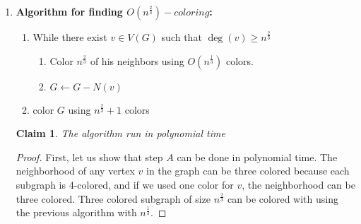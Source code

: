 \documentclass{article}
\newtheorem{claim}[section]{Claim}
\begin{document}
\begin{enumerate}
\begin{enumerate}
	\begin{claim}
		The algorithm run in polynomial time
\end{claim}
\begin{proof}
	First, let us show that step $A$ can be done in polynomial time. The neighborhood of any vertex $v$ in the graph can be two colored because each subgraph is three colored, and if we used one color for $v$, the neighborhood can be two colored. Two colored subgraph is also a two bipartite graph, hence we can use the previous question to color it using 2 colors.
	
	The loop in step $i$ runs at most $\sqrt{n}$ times because each iteration, we remove at least $\sqrt{n}$ vertices from $G$. Additionally, each iteration run polynomial time. Hence, the total run time of step $i$ is polynomial.
	
	Step $ii$ runs in polynomial time using the algorithm from the previous section.
\end{proof}

\begin{claim}
	The algorithm is using $O(\sqrt n)$ colors
\end{claim}
\begin{proof}
	In each iteration of loop $i$, we use two colors. There are at most $\sqrt{n}$ iteration, hence for step $i$ we use $2 \sqrt n = O(\sqrt n)$ colors.
	For step $i$ we used $\sqrt n + 1$ colors.
	For that reason, the total number of colors used by the algorithm is $O(\sqrt n)$.
\end{proof}
\item 
\textbf{Algorithm for finding $O(n^\frac{2}{3})-coloring$:}
	\begin{enumerate}
		\item While there exist $v \in V(G)$ such that $\deg(v) \geq n^\frac{2}{3}$
		\begin{enumerate}
			\item Color $n^\frac{2}{3}$ of his neighbors using $O(n^\frac{1}{3})$ colors.
			\item $G \leftarrow G - N(v)$
		\end{enumerate}
		\item color $G$ using $n^\frac{2}{3} + 1$ colors
	\end{enumerate}
	
	
	\begin{claim}
		The algorithm run in polynomial time
	\end{claim}
	\begin{proof}
		First, let us show that step $A$ can be done in polynomial time. The neighborhood of any vertex $v$ in the graph can be three colored because each subgraph is 4-colored, and if we used one color for $v$, the neighborhood can be three colored. Three colored subgraph of size $n^\frac{2}{3}$ can be colored with using the previous algorithm with $n^\frac{1}{3}$.
		

\end{proof}
\end{enumerate}
\end{enumerate}
\end{document}
